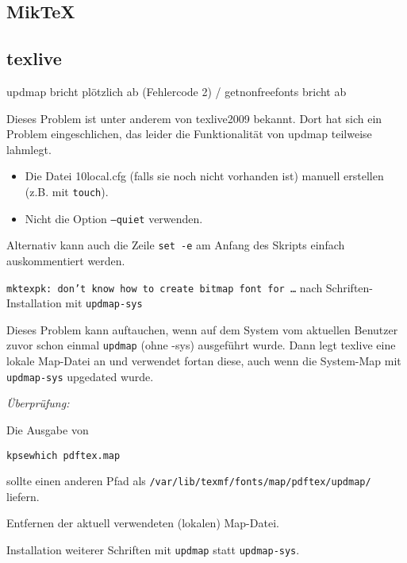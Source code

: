 \subsection{MikTeX}

\subsection{texlive}

\begin{knownissue}{%
  updmap bricht plötzlich ab (Fehlercode 2) / getnonfreefonts bricht ab
}

Dieses Problem ist unter anderem von texlive2009 bekannt.
Dort hat sich ein Problem eingeschlichen, das leider die Funktionalität von
updmap teilweise lahmlegt.

\begin{itemize}
  \item Die Datei 10local.cfg (falls sie noch nicht vorhanden ist) manuell
    erstellen (z.B. mit \texttt{touch}).
  \item Nicht die Option \texttt{--quiet} verwenden.
\end{itemize}

Alternativ kann auch die Zeile \lstinline{set -e} am Anfang des Skripts einfach auskommentiert werden.
\end{knownissue}


\begin{knownissue}{
  \texttt{mktexpk: don't know how to create bitmap font for \ldots}\newline
  nach Schriften-Installation mit \lstinline{updmap-sys}}

Dieses Problem kann auftauchen, wenn auf dem System vom aktuellen Benutzer
zuvor schon einmal \lstinline{updmap} (ohne -sys) ausgeführt wurde.
Dann legt texlive eine lokale Map-Datei an und verwendet fortan diese,
auch wenn die System-Map mit \lstinline{updmap-sys} upgedated wurde.

\noindent\textit{Überprüfung:}

Die Ausgabe von
\begin{lstlisting}
kpsewhich pdftex.map
\end{lstlisting}
sollte einen anderen Pfad als
\lstinline{/var/lib/texmf/fonts/map/pdftex/updmap/} liefern.


Entfernen der aktuell verwendeten (lokalen) Map-Datei.


Installation weiterer Schriften mit \lstinline{updmap} statt
\lstinline{updmap-sys}.

\end{knownissue}




